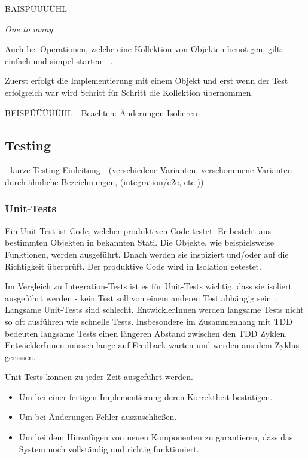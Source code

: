 BAISPÜÜÜÜHL\newline\newline

\textit{One to many}

Auch bei Operationen, welche eine Kollektion von Objekten benötigen, gilt: einfach und simpel starten - \autocite[154]{Beck:2003}.

Zuerst erfolgt die Implementierung mit einem Objekt und erst wenn der Test erfolgreich war wird Schritt für Schritt die Kollektion übernommen.

BEISPÜÜÜÜÜHL - Beachten: Änderungen Isolieren
\newpage


\subsection{Testing}
 - kurze Testing Einleitung - (verschiedene Varianten, verschommene Varianten durch ähnliche Bezeichnungen, (integration/e2e, etc.))

\subsubsection{Unit-Tests}
Ein Unit-Test ist Code, welcher produktiven Code testet. Er besteht aus bestimmten Objekten in bekannten Stati. Die Objekte, wie beispielsweise Funktionen, werden ausgeführt. Dnach werden sie inspiziert und/oder auf die Richtigkeit überprüft. Der produktive Code wird in Isolation getestet.

Im Vergleich zu Integration-Tests ist es für Unit-Tests wichtig, dass sie isoliert ausgeführt werden - kein Test soll von einem anderen Test abhängig sein \autocite[4]{Johansen:2011}. Langsame Unit-Tests sind schlecht. EntwicklerInnen werden langsame Tests nicht so oft ausführen wie schnelle Tests. Insbesondere im Zusammenhang mit TDD bedeuten langsame Tests einen längeren Abstand zwischen den TDD Zyklen. EntwicklerInnen müssen lange auf Feedback warten und werden aus dem Zyklus gerissen.

Unit-Tests können zu jeder Zeit ausgeführt werden.
\begin{itemize}
  \item Um bei einer fertigen Implementierung deren Korrektheit bestätigen.
  \item Um bei Änderungen Fehler auszuschließen.
  \item Um bei dem Hinzufügen von neuen Komponenten zu garantieren, dass das System noch vollständig und richtig funktioniert.
\end{itemize}

